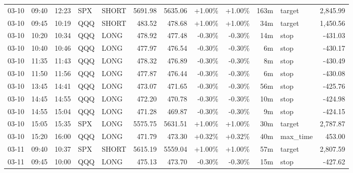 \documentclass[11pt,a4paper,twoside]{article}
\begin{document}
\begin{center}
\begin{longtable}{>{\color{txtmain}}l l l l l r r r r r >{\color{txtmain}}l r}
03-10 & 09:40 & 12:23 & SPX & SHORT & 5691.98 & 5635.06 & \textcolor{wingreen}{+1.00\%} & \textcolor{wingreen}{+1.00\%} & 163m & target & \textcolor{wingreen}{2,845.99} \\
03-10 & 09:45 & 10:19 & QQQ & SHORT & 483.52 & 478.68 & \textcolor{wingreen}{+1.00\%} & \textcolor{wingreen}{+1.00\%} & 34m & target & \textcolor{wingreen}{1,450.56} \\
03-10 & 10:20 & 10:34 & QQQ & LONG & 478.92 & 477.48 & \textcolor{lossred}{-0.30\%} & \textcolor{lossred}{-0.30\%} & 14m & stop & \textcolor{lossred}{-431.03} \\
03-10 & 10:40 & 10:46 & QQQ & LONG & 477.97 & 476.54 & \textcolor{lossred}{-0.30\%} & \textcolor{lossred}{-0.30\%} & 6m & stop & \textcolor{lossred}{-430.17} \\
03-10 & 11:35 & 11:43 & QQQ & LONG & 478.32 & 476.89 & \textcolor{lossred}{-0.30\%} & \textcolor{lossred}{-0.30\%} & 8m & stop & \textcolor{lossred}{-430.49} \\
03-10 & 11:50 & 11:56 & QQQ & LONG & 477.87 & 476.44 & \textcolor{lossred}{-0.30\%} & \textcolor{lossred}{-0.30\%} & 6m & stop & \textcolor{lossred}{-430.08} \\
03-10 & 13:45 & 14:41 & QQQ & LONG & 473.07 & 471.65 & \textcolor{lossred}{-0.30\%} & \textcolor{lossred}{-0.30\%} & 56m & stop & \textcolor{lossred}{-425.76} \\
03-10 & 14:45 & 14:55 & QQQ & LONG & 472.20 & 470.78 & \textcolor{lossred}{-0.30\%} & \textcolor{lossred}{-0.30\%} & 10m & stop & \textcolor{lossred}{-424.98} \\
03-10 & 14:55 & 15:04 & QQQ & LONG & 471.28 & 469.87 & \textcolor{lossred}{-0.30\%} & \textcolor{lossred}{-0.30\%} & 9m & stop & \textcolor{lossred}{-424.15} \\
03-10 & 15:05 & 15:35 & SPX & LONG & 5575.75 & 5631.51 & \textcolor{wingreen}{+1.00\%} & \textcolor{wingreen}{+1.00\%} & 30m & target & \textcolor{wingreen}{2,787.87} \\
03-10 & 15:20 & 16:00 & QQQ & LONG & 471.79 & 473.30 & \textcolor{wingreen}{+0.32\%} & \textcolor{wingreen}{+0.32\%} & 40m & max\_time & \textcolor{wingreen}{453.00} \\
03-11 & 09:40 & 10:37 & SPX & SHORT & 5615.19 & 5559.04 & \textcolor{wingreen}{+1.00\%} & \textcolor{wingreen}{+1.00\%} & 57m & target & \textcolor{wingreen}{2,807.59} \\
03-11 & 09:45 & 10:00 & QQQ & LONG & 475.13 & 473.70 & \textcolor{lossred}{-0.30\%} & \textcolor{lossred}{-0.30\%} & 15m & stop & \textcolor{lossred}{-427.62} \\

\end{longtable}
\end{center}
\end{document}
